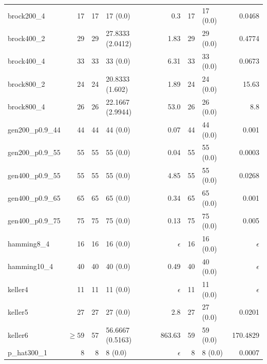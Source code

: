 \documentclass[conference]{IEEEtran}
\begin{document}
\begin{center}
\begin{table}[ht]
{\begin{tabular}{lr|rlr|rlr}
 brock200\_4       &           17  &    17  &  17 (0.0)           &          0.3  &    17  &  17 (0.0)        &      0.0468  \\
 brock400\_2       &           29  &    29  &  27.8333 (2.0412)   &         1.83  &    29  &  29 (0.0)        &      0.4774  \\
 brock400\_4       &           33  &    33  &  33 (0.0)           &         6.31  &    33  &  33 (0.0)        &      0.0673  \\
 brock800\_2       &           24  &    24  &  20.8333 (1.602)    &         1.89  &    24  &  24 (0.0)        &       15.63  \\
 brock800\_4       &           26  &    26  &  22.1667 (2.9944)   &         53.0  &    26  &  26 (0.0)        &         8.8  \\
 gen200\_p0.9\_44  &           44  &    44  &  44 (0.0)           &         0.07  &    44  &  44 (0.0)        &       0.001  \\
 gen200\_p0.9\_55  &           55  &    55  &  55 (0.0)           &         0.04  &    55  &  55 (0.0)        &      0.0003  \\
 gen400\_p0.9\_55  &           55  &    55  &  55 (0.0)           &         4.85  &    55  &  55 (0.0)        &      0.0268  \\
 gen400\_p0.9\_65  &           65  &    65  &  65 (0.0)           &         0.34  &    65  &  65 (0.0)        &       0.001  \\
 gen400\_p0.9\_75  &           75  &    75  &  75 (0.0)           &         0.13  &    75  &  75 (0.0)        &       0.005  \\
 hamming8\_4       &           16  &    16  &  16 (0.0)           &   $\epsilon$  &    16  &  16 (0.0)        &  $\epsilon$  \\
 hamming10\_4      &           40  &    40  &  40 (0.0)           &         0.49  &    40  &  40 (0.0)        &  $\epsilon$  \\
 keller4           &           11  &    11  &  11 (0.0)           &   $\epsilon$  &    11  &  11 (0.0)        &  $\epsilon$  \\
 keller5           &           27  &    27  &  27 (0.0)           &          2.8  &    27  &  27 (0.0)        &      0.0201  \\
 keller6           &    $\geq 59$  &    57  &  56.6667 (0.5163)   &       863.63  &    59  &  59 (0.0)        &    170.4829  \\
 p\_hat300\_1      &            8  &     8  &  8 (0.0)            &   $\epsilon$  &     8  &  8 (0.0)         &      0.0007  \\

\end{tabular}}
\end{table}
\end{center}
\end{document}
